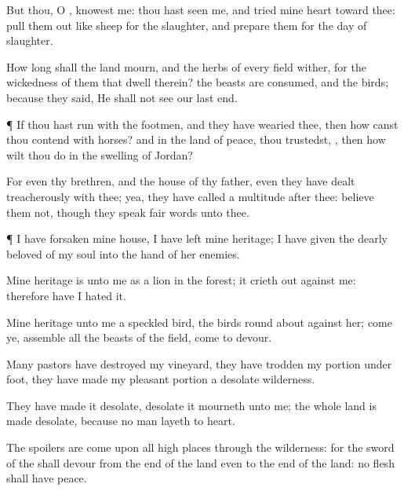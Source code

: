 {But thou, O
{},
knowest me: thou hast
seen me, and
tried mine
heart toward thee: pull them
out like
sheep for the
slaughter, and
prepare them for the
day of
slaughter.

How long shall the
land
mourn, and the
herbs of every
field
wither, for the
wickedness of them that
dwell therein? the
beasts are
consumed, and the
birds; because they
said, He shall not
see our last
end.


\par }{\PP {}¶ If thou hast
run with the
footmen, and they have
wearied thee, then how canst thou
contend with
horses? and
{} in the
land of
peace,
{} thou
trustedst,
{}, then how wilt thou
do in the
swelling of
Jordan?

For even thy
brethren, and the
house of thy
father, even they have dealt
treacherously with thee; yea, they have
called a
multitude
after thee:
believe them not, though they
speak fair
words unto thee.


\par }{\PP {}¶ I have
forsaken mine
house, I have
left mine
heritage; I have
given the dearly
beloved of my
soul into the
hand of her
enemies.

Mine
heritage is unto me as a
lion in the
forest; it crieth
out against me: therefore have I
hated it.

Mine
heritage
{} unto me
{} a
speckled
bird, the
birds round
about
{} against her;
come ye,
assemble all the
beasts of the
field,
come to
devour.

Many
pastors have
destroyed my
vineyard, they have
trodden my
portion under
foot, they have
made my
pleasant
portion a
desolate
wilderness.

They have
made it
desolate,
{}
desolate it
mourneth unto me; the whole
land is made
desolate, because no
man
layeth
{} to
heart.

The
spoilers are
come upon all high
places through the
wilderness: for the
sword of the
{} shall
devour from the
{}
end of the
land even to the
{}
end of the
land: no
flesh shall have
peace.

}
